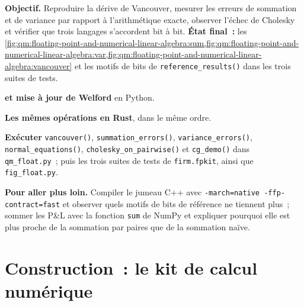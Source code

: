 \begin{tutorial}
\textbf{Objectif.} Reproduire la dérive de Vancouver, mesurer les erreurs de sommation et de variance par rapport à l'arithmétique exacte, observer l'échec de Cholesky et vérifier que trois langages s'accordent bit à bit.
\textbf{État final~:} les \cref{fig:qm:floating-point-and-numerical-linear-algebra:sum,fig:qm:floating-point-and-numerical-linear-algebra:var,fig:qm:floating-point-and-numerical-linear-algebra:vancouver}
et les motifs de bits de \texttt{reference\_results()} dans les trois suites de tests.
\begin{tutsteps}
\item \textbf{ et mise à jour de Welford} en Python.
\label{lst:qm:floating-point-and-numerical-linear-algebra:py}
\item \textbf{Les mêmes opérations en Rust}, dans le même ordre.
\label{lst:qm:floating-point-and-numerical-linear-algebra:rs}
\item \textbf{Exécuter} \texttt{vancouver()}, \texttt{summation\_errors()}, \texttt{variance\_errors()}, \texttt{normal\_equations()}, \texttt{cholesky\_on\_pairwise()} et \texttt{cg\_demo()} dans
\texttt{qm\_float.py}~; puis les trois suites de tests de \texttt{firm.fpkit}, ainsi que \texttt{fig\_float.py}.
\end{tutsteps}
\textbf{Pour aller plus loin.} Compiler le jumeau C++ avec \texttt{-march=native -ffp-contract=fast} et observer quels motifs de bits de référence ne tiennent plus~; sommer les P\&L avec la fonction \texttt{sum} de NumPy et expliquer pourquoi
elle est plus proche de la sommation par paires que de la sommation naïve.
\end{tutorial}

\section{Construction~: le kit de calcul numérique}\label{bld:qm:floating-point-and-numerical-linear-algebra:fpkit}

